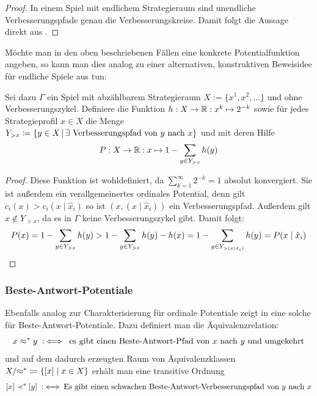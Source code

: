 \begin{proof}
	In einem Spiel mit endlichem Strategieraum sind unendliche Verbesserungspfade genau die Verbesserungskreise. Damit folgt die Aussage direkt aus .
\end{proof}

\begin{bem}
	Möchte man in den oben beschriebenen Fällen eine konkrete Potentialfunktion angeben, so kann man dies analog zu einer alternativen, konstruktiven Beweisidee für endliche Spiele aus \cite[Abschnitt 5]{CongGamesPlayerSpecPayoff} tun:

Sei dazu $\Gamma$ ein Spiel mit abzählbarem Strategieraum $X := \{x^1, x^2, \dots \}$ und ohne Verbesserungszykel. Definiere die Funktion $h: X \to \mathbb{R}: x^k \mapsto 2^{-k}$ sowie für jedes Strategieprofil $x \in X$ die Menge $Y_{>x} \coloneqq \left\{y \in X \,\middle|\, \exists \text{ Verbesserungspfad von } y \text{ nach } x\right\}$ und mit deren Hilfe
	\[P: X \to \mathbb{R}: x \mapsto 1 - \sum_{y \in Y_{>x}} h(y)\]
\end{bem}

\begin{proof}
	Diese Funktion ist wohldefiniert, da $\sum_{k=1}^{\infty} 2^{-k} = 1$ absolut konvergiert. Sie ist außerdem ein verallgemeinertes ordinales Potential, denn gilt $c_i(x) > c_i(x \mid \hat{x}_i)$ so ist $(x, (x \mid \hat{x}_i))$ ein Verbesserungspfad. Außerdem gilt $x \notin Y_{>x}$, da es in $\Gamma$ keine Verbesserungszykel gibt. Damit folgt:
		\[P(x) = 1 - \sum_{y \in Y_{>x}} h(y) > 1 - \sum_{y \in Y_{>x}} h(y) - h(x) = 1 - \sum_{y \in Y_{>(x \mid \hat{x}_i)}}h(y) = P(x \mid \hat{x}_i)\qedhere\]
\end{proof}


\subsubsection{Beste-Antwort-Potentiale}

Ebenfalls analog zur Charakterisierung für ordinale Potentiale zeigt \citeauthor{BestRespPot} in \cite[Theorem 3.1]{BestRespPot} eine solche für Beste-Antwort-Potentiale. Dazu definiert man die Äquivalenzrelation:
	\[x \approx^\ast y \mathbin{~\mathop:\!\!\iff} \text{ es gibt einen Beste-Antwort-Pfad von $x$ nach $y$ und umgekehrt}\]
und auf dem dadurch erzeugten Raum von Äquivalenzklassen $X/{\approx^\ast} \coloneqq \left\lbrace[x] \mid x \in X\right\rbrace$ erhält man eine transitive Ordnung
\[[x] \prec^\ast [y] \mathbin{~\mathop:\!\!\iff} \text{Es gibt einen schwachen Beste-Antwort-Verbesserungspfad von $y$ nach $x$}\]

